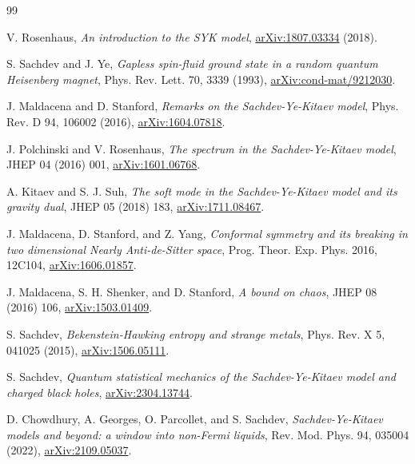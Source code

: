 \documentclass[11pt]{article}
\numberwithin{equation}{section}
\theoremstyle{exposition}
\theoremstyle{result}
\begin{document}
\clearpage
{}
{}

\begin{thebibliography}{99}
\small
\setlength{\itemsep}{2pt}

V. Rosenhaus,
\emph{An introduction to the SYK model},
\href{https://arxiv.org/abs/1807.03334}{arXiv:1807.03334} (2018).

S. Sachdev and J. Ye,
\emph{Gapless spin-fluid ground state in a random quantum Heisenberg magnet},
Phys. Rev. Lett. 70, 3339 (1993), \href{https://arxiv.org/abs/cond-mat/9212030}{arXiv:cond-mat/9212030}.

J. Maldacena and D. Stanford,
\emph{Remarks on the Sachdev-Ye-Kitaev model},
Phys. Rev. D 94, 106002 (2016), \href{https://arxiv.org/abs/1604.07818}{arXiv:1604.07818}.

J. Polchinski and V. Rosenhaus,
\emph{The spectrum in the Sachdev-Ye-Kitaev model},
JHEP 04 (2016) 001, \href{https://arxiv.org/abs/1601.06768}{arXiv:1601.06768}.

A. Kitaev and S. J. Suh,
\emph{The soft mode in the Sachdev-Ye-Kitaev model and its gravity dual},
JHEP 05 (2018) 183, \href{https://arxiv.org/abs/1711.08467}{arXiv:1711.08467}.

J. Maldacena, D. Stanford, and Z. Yang,
\emph{Conformal symmetry and its breaking in two dimensional Nearly Anti-de-Sitter space},
Prog. Theor. Exp. Phys. 2016, 12C104, \href{https://arxiv.org/abs/1606.01857}{arXiv:1606.01857}.

J. Maldacena, S. H. Shenker, and D. Stanford,
\emph{A bound on chaos},
JHEP 08 (2016) 106, \href{https://arxiv.org/abs/1503.01409}{arXiv:1503.01409}.

S. Sachdev,
\emph{Bekenstein-Hawking entropy and strange metals},
Phys. Rev. X 5, 041025 (2015), \href{https://arxiv.org/abs/1506.05111}{arXiv:1506.05111}.

S. Sachdev,
\emph{Quantum statistical mechanics of the Sachdev-Ye-Kitaev model and charged black holes},
\href{https://arxiv.org/abs/2304.13744}{arXiv:2304.13744}.

D. Chowdhury, A. Georges, O. Parcollet, and S. Sachdev,
\emph{Sachdev-Ye-Kitaev models and beyond: a window into non-Fermi liquids},
Rev. Mod. Phys. 94, 035004 (2022), \href{https://arxiv.org/abs/2109.05037}{arXiv:2109.05037}.


\end{thebibliography}
\end{document}
